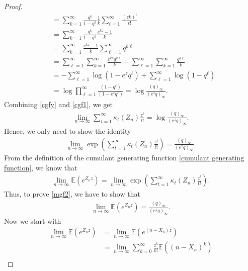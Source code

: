 \documentclass[11pt,reqno]{amsart}
\renewcommand{\(}{\left\(}
\renewcommand{\)}{\right\)}
\renewcommand{\[}{\left\[}
\renewcommand{\]}{\right\]}
\numberwithin{equation}{section}
\theoremstyle{plain}
\begin{document}
\begin{proof}
\begin{align}
&=\sum_{k=1}^\infty\frac{q^k}{1-q^k} \frac{1}{k}\sum_{t=1}^\infty \frac{(zk)^t}{t!} \nonumber \\
&=\sum_{k=1}^\infty\frac{q^k}{1-q^k} \frac{e^{kz}-1}{k} \nonumber \\
&=  \sum_{k=1}^\infty\frac{e^{kz}-1}{k} \sum_{\ell=1}^\infty  q^{k\ell} \nonumber \\
&=\sum_{\ell=1}^\infty \sum_{k=1}^\infty\frac{e^{kz}q^{k\ell}}{k}-\sum_{\ell=1}^\infty \sum_{k=1}^\infty\frac{q^{k\ell}}{k} \nonumber \\
&=-\sum_{\ell=1}^\infty \log(1-e^{z}q^\ell)+ \sum_{\ell=1}^\infty  \log(1-q^\ell) \nonumber \\
&=\log \prod_{\ell=1}^\infty \frac{(1-q^\ell)}{(1-e^{z}q^\ell)} = \log \frac{(q)_\infty}{(e^{z}q)_\infty}.
\end{align}
Combining \eqref{cgfy} and \eqref{cgf1},  we get 
\begin{align*}
\lim_{n\to\infty} \sum_{t= 1}^\infty \kappa_t(Z_n) \frac{z^t}{t!} = \log \frac{(q)_\infty}{(e^{z}q)_\infty}.
\end{align*}
Hence,  we only need to show the identity
\begin{align}\label{mgf2}
\lim_{n\to\infty}\exp\left(  \sum_{t= 1}^\infty \kappa_t(Z_n) \frac{z^t}{t!}\right) = \frac{(q)_\infty}{(e^{z}q)_\infty}.
\end{align}
From the definition of the cumulant generating function \eqref{cumulant generating function}, we know that
\begin{align*}
\lim_{n\to\infty} \mathbb{E}\left(e^{Z_n z}\right) = \lim_{n\to\infty}\exp\left(  \sum_{t= 1}^\infty \kappa_t(Z_n) \frac{z^t}{t!}\right).
\end{align*}
Thus, to prove \eqref{mgf2}, we have to show that 
\begin{align*}
\lim_{n\to\infty} \mathbb{E}\left(e^{Z_n z}\right) = \frac{(q)_\infty}{(e^{z}q)_\infty}.
\end{align*}
Now we start with
\begin{align}\label{mgf3}
\lim_{n\to\infty} \mathbb{E}\left(e^{Z_n z}\right)&= \lim_{n\to\infty} \mathbb{E}\left( e^{(n-X_n) z}\right) \nonumber \\
&=\lim_{n\to\infty} \sum_{k=0}^\infty\frac{z^k}{k!} \mathbb{E}\left((n-X_n)^k\right) \nonumber\\

\end{align}
\end{proof}
\end{document}
